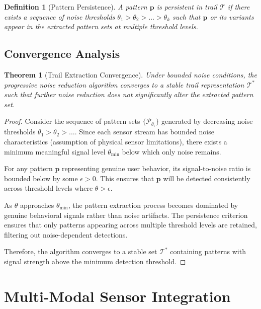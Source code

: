 \documentclass[12pt,a4paper]{article}
\newtheorem{theorem}{Theorem}
\newtheorem{definition}{Definition}
\begin{document}
\begin{definition}[Pattern Persistence]
A pattern $\mathbf{p}$ is persistent in trail $\mathcal{T}$ if there exists a sequence of noise thresholds $\theta_1 > \theta_2 > \ldots > \theta_k$ such that $\mathbf{p}$ or its variants appear in the extracted pattern sets at multiple threshold levels.
\end{definition}

\subsection{Convergence Analysis}

\begin{theorem}[Trail Extraction Convergence]
Under bounded noise conditions, the progressive noise reduction algorithm converges to a stable trail representation $\mathcal{T}^*$ such that further noise reduction does not significantly alter the extracted pattern set.
\end{theorem}

\begin{proof}
Consider the sequence of pattern sets $\{\mathcal{P}_{\theta_i}\}$ generated by decreasing noise thresholds $\theta_1 > \theta_2 > \ldots$. Since each sensor stream has bounded noise characteristics (assumption of physical sensor limitations), there exists a minimum meaningful signal level $\theta_{\text{min}}$ below which only noise remains.

For any pattern $\mathbf{p}$ representing genuine user behavior, its signal-to-noise ratio is bounded below by some $\epsilon > 0$. This ensures that $\mathbf{p}$ will be detected consistently across threshold levels where $\theta > \epsilon$.

As $\theta$ approaches $\theta_{\text{min}}$, the pattern extraction process becomes dominated by genuine behavioral signals rather than noise artifacts. The persistence criterion ensures that only patterns appearing across multiple threshold levels are retained, filtering out noise-dependent detections.

Therefore, the algorithm converges to a stable set $\mathcal{T}^*$ containing patterns with signal strength above the minimum detection threshold.
\end{proof}

\section{Multi-Modal Sensor Integration}
\end{document}
